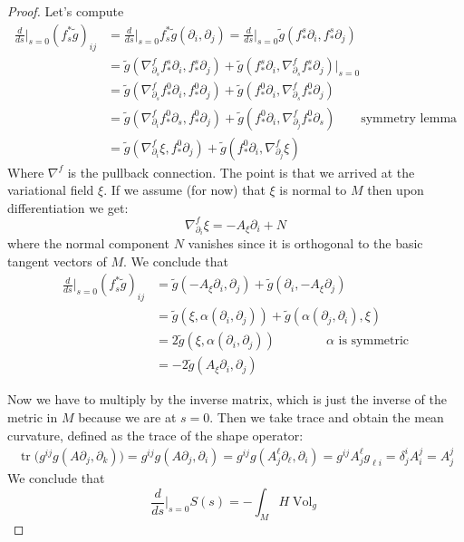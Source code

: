 \begin{proof}
Let's compute $$
\begin{aligned}
\frac{d}{ds}\Big|_{s=0}(f_s^*\tilde{g})_{ij}
&=\frac{d}{ds}\Big|_{s=0}f_s^*\tilde{g}
\left(\partial_i,\partial_j\right)
=\frac{d}{ds}\Big|_{s=0}\tilde{g}
(f^s_*\partial_i,f^s_*\partial_j)\\
&=\tilde{g}\left(\nabla^f_{\partial_s}
f^s_*\partial_i,f^s_*\partial_j\right)
+\tilde{g}
\left(f^s_*\partial_i,\nabla^f_{\partial_s}
f_*^s\partial_j\right)\Big|_{s=0}\\
&=\tilde{g}\left(\nabla^f_{\partial_s}
f^0_*\partial_i,f_*^0\partial_j\right)
+\tilde{g}\left(f^0_*\partial_i,
\nabla^f_{\partial_s}f_*^0\partial_j\right)\\
&=\tilde{g}\left(\nabla^f_{\partial_i}
f^0_*\partial_s,f_*^0\partial_j\right)
+\tilde{g}\left(f^0_*\partial_i,
\nabla^f_{\partial_j}f_*^0\partial_s\right)
\qquad  \text{symmetry lemma} \\
&=\tilde{g}(\nabla^f_{\partial_i}\xi,
f_*^0\partial_j)
+\tilde{g}(f^0_*\partial_i,
\nabla^f_{\partial_j}\xi)\end{aligned}
$$
Where
$\nabla^f$ is the pullback connection. The
point is that we arrived at the
variational field $\xi$. If we assume (for
now) that $\xi$ is normal to $M$ then
upon differentiation we get: $$
\nabla^f_{\partial_i}\xi=-A_{\xi}\partial_i+N
$$
where the normal component $N$ vanishes since
it is orthogonal to the basic
tangent vectors of $M$. We conclude that
$$
\begin{aligned}
\frac{d}{ds}\Big|_{s=0}(f_s^*\tilde{g})_{ij}
&=\tilde{g}\left(-A_{\xi}\partial_i,
\partial_j\right)
+\tilde{g}\left(\partial_i,-A_{\xi}
\partial_j\right)\\
&=\tilde{g}(\xi,\alpha(\partial_i,\partial_j)
)
+\tilde{g}(\alpha(\partial_j,\partial_i),\xi)
\\
&=2\tilde{g}(\xi,\alpha(\partial_i,
\partial_j))\qquad\qquad
\text{$\alpha$ is symmetric}\\
&=-2\tilde{g}(A_{\xi}\partial_i,\partial_j)
\end{aligned}
$$

Now we have to multiply by the inverse
matrix, which is just the inverse of the
metric in $M$ because we are at $s=0$. Then
we take trace and obtain the mean
curvature, defined as the trace of the shape
operator:
$$
\begin{aligned}
\operatorname{tr}\Big(g^{ij}g(A
\partial_j,\partial_k)\Big)
=g^{ij}g(A \partial_j,\partial_i)
=g^{ij}g(A^\ell_j\partial_\ell,\partial_i)
=g^{ij}A^\ell_jg_{\ell i}
=\delta^{i}_jA^j_i
=A^j_j
\end{aligned}
$$
We conclude that
$$
\frac{d}{ds}\Big|_{s=0}S(s)=-\int_M H
\operatorname{Vol}_{g}
$$
\end{proof}

